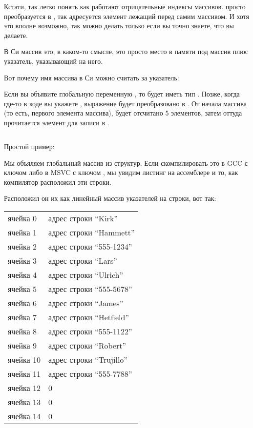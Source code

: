 Кстати, так легко понять как работают отрицательные индексы массивов.  просто преобразуется в ,
так адресуется элемент лежащий перед самим массивом.
И хотя это вполне возможно, так можно делать только если вы точно знаете, что вы делаете.

В Си массив это, в каком-то смысле, это просто место в памяти под массив плюс указатель, указывающий
на него. 

Вот почему имя массива в Си можно считать за указатель:

Если вы объявите глобальную переменную , то  будет иметь тип .
Позже, когда где-то в коде
вы укажете , выражение будет преобразовано в . От начала массива (то есть, первого элемента
массива), будет отсчитано 5 элементов, затем оттуда прочитается элемент для записи в .

\label{PtrArith}
\subsection{}

Простой пример:



Мы объяляем глобальный массив из структур. Если скомпилировать это в GCC с ключом  либо в MSVC с ключом
, мы увидим листинг на ассемблере и то, как компилятор расположил эти строки. 

Расположил он их как линейный массив указателей на строки, вот так:

\begin{center}
\begin{tabular}{ | l | l | }
\hline
  ячейка 0    & адрес строки ``Kirk'' \\
  ячейка 1    & адрес строки ``Hammett'' \\
  ячейка 2    & адрес строки ``555-1234'' \\
  ячейка 3    & адрес строки ``Lars'' \\
  ячейка 4    & адрес строки ``Ulrich'' \\
  ячейка 5    & адрес строки ``555-5678'' \\
  ячейка 6    & адрес строки ``James'' \\
  ячейка 7    & адрес строки ``Hetfield'' \\
  ячейка 8    & адрес строки ``555-1122'' \\
  ячейка 9    & адрес строки ``Robert'' \\
  ячейка 10   & адрес строки ``Trujillo'' \\
  ячейка 11   & адрес строки ``555-7788'' \\
  ячейка 12   & 0 \\
  ячейка 13   & 0 \\
  ячейка 14   & 0 \\
\hline
\end{tabular}
\end{center}

